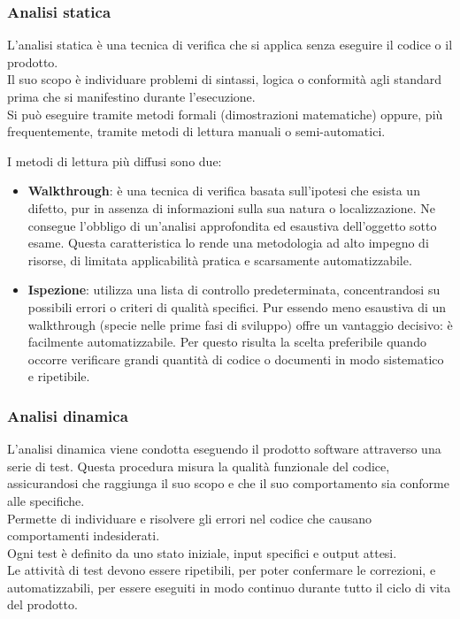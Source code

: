 \subsubsection{Analisi statica}
L'analisi statica è una tecnica di verifica che si applica senza eseguire il codice o il prodotto.\\
Il suo scopo è individuare problemi di sintassi, logica o conformità agli standard prima che si manifestino durante l'esecuzione.\\
Si può eseguire tramite metodi formali (dimostrazioni matematiche) oppure, più frequentemente, tramite metodi di lettura manuali o semi-automatici.

I metodi di lettura più diffusi sono due:
\begin{itemize}[itemsep=3pt, parsep=1pt, label=$\scriptstyle\bullet$]
    \item \textbf{Walkthrough}: è una tecnica di verifica basata sull'ipotesi che esista un difetto, pur in assenza di informazioni sulla sua natura o localizzazione. Ne consegue l'obbligo di un'analisi approfondita ed esaustiva dell'oggetto sotto esame. Questa caratteristica lo rende una metodologia ad alto impegno di risorse, di limitata applicabilità pratica e scarsamente automatizzabile.
    \item \textbf{Ispezione}: utilizza una lista di controllo predeterminata, concentrandosi su possibili errori o criteri di qualità specifici. Pur essendo meno esaustiva di un walkthrough (specie nelle prime fasi di sviluppo) offre un vantaggio decisivo: è facilmente automatizzabile. Per questo risulta la scelta preferibile quando occorre verificare grandi quantità di codice o documenti in modo sistematico e ripetibile.
\end{itemize}

\subsubsection{Analisi dinamica}
L'analisi dinamica viene condotta eseguendo il prodotto software attraverso una serie di test. Questa procedura misura la qualità funzionale del codice, assicurandosi che raggiunga il suo scopo e che il suo comportamento sia conforme alle specifiche.\\
Permette di individuare e risolvere gli errori nel codice che causano comportamenti indesiderati.\\
Ogni test è definito da uno stato iniziale, input specifici e output attesi.\\
Le attività di test devono essere ripetibili, per poter confermare le correzioni, e automatizzabili, per essere eseguiti in modo continuo durante tutto il ciclo di vita del prodotto.

